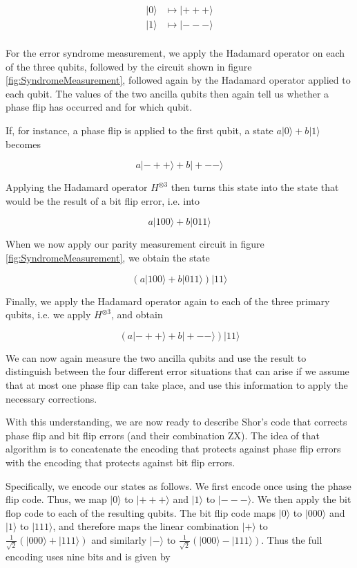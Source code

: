 \documentclass[a4paper, draft]{article}
\theoremstyle{own}
\theoremstyle{remark}
\begin{document}
\begin{align*}
|0 \rangle & \mapsto |+++ \rangle \\
|1 \rangle & \mapsto |--- \rangle \\
\end{align*}

For the error syndrome measurement, we apply the Hadamard operator on each of the three qubits, followed by the circuit shown in figure \ref{fig:SyndromeMeasurement}, followed again by the Hadamard operator applied to each qubit. The values of the two ancilla 	qubits then again tell us whether a phase flip has occurred and for which qubit. 

If, for instance, a phase flip is applied to the first qubit, a state $a |0 \rangle + b |1\rangle$ becomes

$$
a |-++ \rangle + b |+-- \rangle
$$

Applying the Hadamard operator $H^{\otimes 3}$ then turns this state into the state that would be the result of a bit flip error, i.e. into

$$
a |100 \rangle + b |011 \rangle
$$

When we now apply our parity measurement circuit in figure \ref{fig:SyndromeMeasurement}, we obtain the state

$$
(a |100 \rangle + b |011 \rangle) |11 \rangle
$$

Finally, we apply the Hadamard operator again to each of the three primary qubits, i.e. we apply $H^{\otimes 3}$, and obtain

$$
(a |-++ \rangle + b |+-- \rangle) |11 \rangle
$$

We can now again measure the two ancilla qubits and use the result to distinguish between the four different error situations that can arise if we assume that at most one phase flip can take place, and use this information to apply the necessary corrections.

With this understanding, we are now ready to describe Shor's code that corrects phase flip and bit flip errors (and their combination ZX). The idea of that algorithm is to concatenate the encoding that protects against phase flip errors with the encoding that protects against bit flip errors. 

Specifically, we encode our states as follows. We first encode once using the phase flip code. Thus, we map $|0 \rangle $ to $|+++\rangle$ and $|1 \rangle $ to $|--- \rangle$. We then apply the bit flop code to each of the resulting qubits. The bit flip code maps $|0 \rangle$ to $|000 \rangle$ and $|1 \rangle$ to $|111 \rangle$, and therefore maps the linear combination $|+\rangle $ to $\frac{1}{\sqrt{2}} (|000 \rangle + |111 \rangle)$ and similarly $|-\rangle $ to $\frac{1}{\sqrt{2}} (|000 \rangle - |111 \rangle)$. Thus the full encoding uses nine bits and is given by
\end{document}

